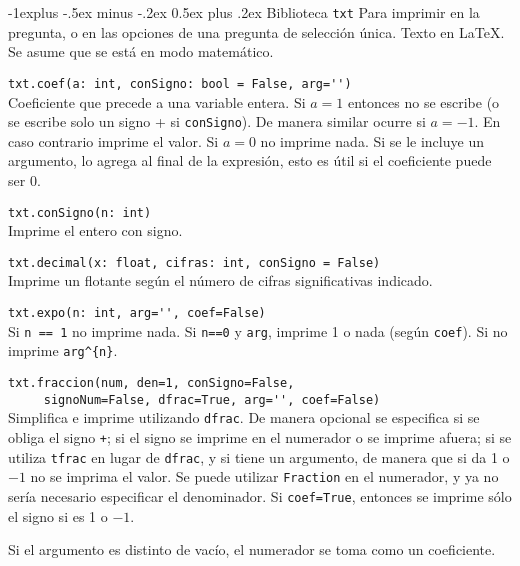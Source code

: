 \documentclass[10pt,landscape]{article}
\makeatletter
\renewcommand{\subsection}{\@startsection{subsection}{2}{0mm}%
                                {-1explus -.5ex minus -.2ex}%
                                {0.5ex plus .2ex}%
                                {\normalfont\normalsize\bfseries}}
\makeatother
\begin{document}
\begin{multicols}{3}
\subsection{Biblioteca \texttt{txt}}
Para imprimir en la pregunta, o en las opciones de una pregunta de selecci\'on \'unica. Texto en \LaTeX. Se asume que se est\'a en modo matem\'atico.
\begin{asparaitem}
\item \verb|txt.coef(a: int, conSigno: bool = False, arg='')| \\
\quad Coeficiente que precede a una variable entera. Si $a=1$ entonces no se escribe (o se escribe solo un signo + si \verb|conSigno|). De manera similar ocurre si $a=-1$. En caso contrario imprime el valor. Si $a=0$ no imprime nada. Si se le incluye un argumento, lo agrega al final de la expresi\'on, esto es \'util si el coeficiente puede ser 0.

\item \verb|txt.conSigno(n: int)| \\
\quad Imprime el entero con signo.

\item \verb|txt.decimal(x: float, cifras: int, conSigno = False)| \\
\quad Imprime un flotante según el n\'umero de cifras significativas indicado.

\item \verb|txt.expo(n: int, arg='', coef=False)| \\
  \quad Si \verb|n == 1| no imprime nada. Si \verb|n==0| y \verb|arg|, imprime 1 o nada (seg\'un \verb|coef|). Si no imprime \verb|arg^{n}|.

\item \verb|txt.fraccion(num, den=1, conSigno=False,|\\
      \verb|     signoNum=False, dfrac=True, arg='', coef=False)| \\
  \quad Simplifica e imprime utilizando \verb|dfrac|. De manera opcional se especifica si se obliga el signo \verb|+|; si el signo se imprime en el numerador o se imprime afuera; si se utiliza \verb|tfrac| en lugar de \verb|dfrac|, y si tiene un argumento, de manera que si da 1 o $-1$ no se imprima el valor. Se puede utilizar \verb|Fraction| en el numerador, y ya no ser\'ia necesario especificar el denominador. Si \verb|coef=True|, entonces se imprime sólo el signo si es 1 o $-1$.

Si el argumento es distinto de vac\'io, el numerador se toma como un coeficiente.


\end{asparaitem}
\end{multicols}
\end{document}
